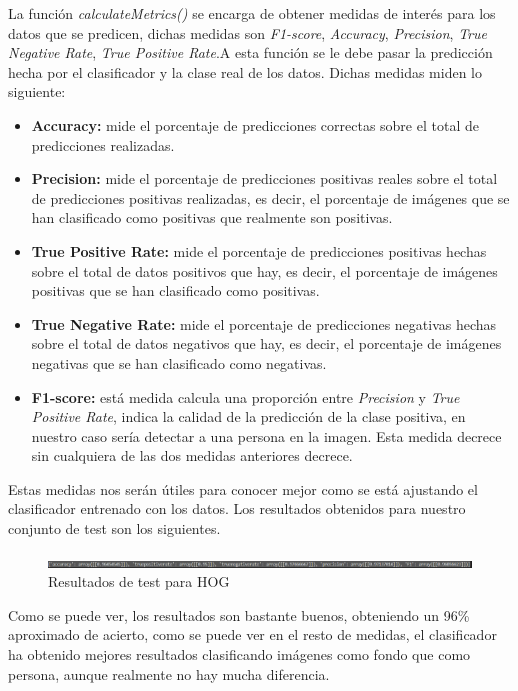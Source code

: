 La función \textit{calculateMetrics()} se encarga de obtener medidas de interés para los datos que se predicen, dichas medidas son \textit{F1-score}, \textit{Accuracy}, \textit{Precision}, \textit{True Negative Rate}, \textit{True Positive Rate}.A esta función se le debe pasar la predicción hecha por el clasificador y la clase real de los datos. Dichas medidas miden lo siguiente:
\begin{itemize}
	\item \textbf{Accuracy:} mide el porcentaje de predicciones correctas sobre el total de predicciones realizadas.
	\item \textbf{Precision:} mide el porcentaje de predicciones positivas reales sobre el total de predicciones positivas realizadas, es decir, el porcentaje de imágenes que se han clasificado como positivas que realmente son positivas.
	\item \textbf{True Positive Rate:} mide el porcentaje de predicciones positivas hechas sobre el total de datos positivos que hay, es decir, el porcentaje de imágenes positivas que se han clasificado como positivas.
	\item \textbf{True Negative Rate:} mide el porcentaje de predicciones negativas hechas sobre el total de datos negativos que hay, es decir, el porcentaje de imágenes negativas que se han clasificado como negativas.
	\item \textbf{F1-score:} está medida calcula una proporción entre \textit{Precision} y \textit{True Positive Rate}, indica la calidad de la predicción de la clase positiva, en nuestro caso sería detectar a una persona en la imagen. Esta medida decrece sin cualquiera de las dos medidas anteriores decrece.
\end{itemize}

Estas medidas nos serán útiles para conocer mejor como se está ajustando el clasificador entrenado con los datos. Los resultados obtenidos para nuestro conjunto de test son los siguientes.
\begin{figure}[H]
	\centering
	\includegraphics[width=140mm]{imagenes/resultados_test}
	\caption{Resultados de test para HOG}
	\label{fig:salida_2}
\end{figure}

Como se puede ver, los resultados son bastante buenos, obteniendo un 96\% aproximado de acierto, como se puede ver en el resto de medidas, el clasificador ha obtenido mejores resultados clasificando imágenes como fondo que como persona, aunque realmente no hay mucha diferencia.

